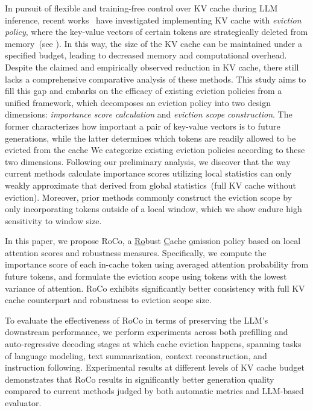 In pursuit of flexible and training-free control over KV cache during LLM inference, recent works~\cite{liu2023scissorhands,h2o,xiao2023efficient,tova} have investigated implementing KV cache with \textit{eviction policy}, where the key-value vectors of certain tokens are strategically deleted from memory~(see ). In this way, the size of the KV cache can be maintained under a specified budget, leading to decreased memory and computational overhead. Despite the claimed and empirically observed reduction in KV cache, there still lacks a comprehensive comparative analysis of these methods. This study aims to fill this gap and embarks on the efficacy of existing eviction policies from a unified framework, which decomposes an eviction policy into two design dimensions: \textit{importance score calculation} and \textit{eviction scope construction}. 
The former characterizes how important a pair of key-value vectors is to future generations, 
while the latter determines which tokens are readily allowed to be evicted from the cache
We categorize existing eviction policies according to these two dimensions. 
Following our preliminary analysis, we discover that the way current methods calculate 
importance scores utilizing local statistics can only weakly approximate that derived 
from global statistics~(full KV cache without eviction). 
Moreover, prior methods commonly 
construct the eviction scope by only incorporating tokens outside of a local window, 
which we show endure high sensitivity to window size. 

In this paper, we propose RoCo, a \underline{R}\underline{o}bust \underline{C}ache \underline{o}mission policy based on local attention scores and robustness measures. Specifically, we compute the importance score of each in-cache token using averaged attention probability from future tokens, 
and formulate the eviction scope using tokens with the lowest variance of attention. 
RoCo exhibits significantly better consistency with 
full KV cache counterpart and robustness to eviction scope size.

To evaluate the effectiveness of RoCo in terms 
of preserving the LLM's downstream performance, we perform experiments across 
both prefilling and auto-regressive decoding stages at which cache eviction happens, 
spanning tasks of language modeling, text summarization, context reconstruction, and 
instruction following. Experimental results at different levels of KV cache 
budget demonstrates that RoCo results in significantly better generation 
quality compared to current methods judged by both automatic metrics and LLM-based evaluator.

